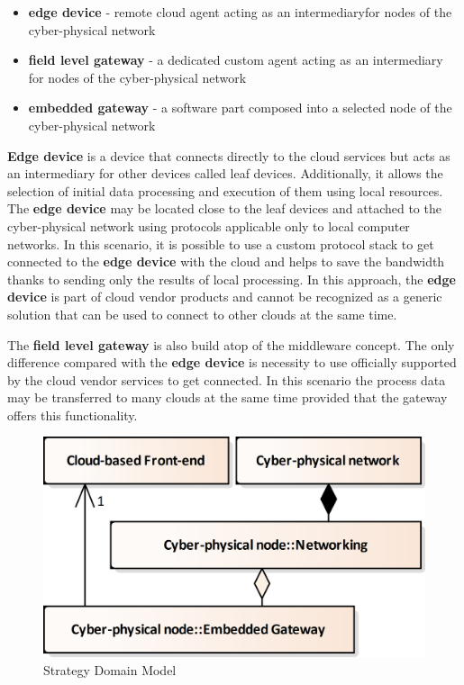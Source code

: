 \documentclass{jacsart}
\begin{document}
\begin{itemize}
      \item \textbf{edge device} - remote cloud agent acting as an intermediaryfor nodes of the cyber-physical network
      \item \textbf{field level gateway} - a dedicated custom agent acting as an intermediary for nodes of the cyber-physical network
      \item \textbf{embedded gateway} - a software part composed into a selected node of the cyber-physical network
\end{itemize}

\textbf{Edge device} is a device that connects directly to the cloud services but acts as an intermediary for other devices called leaf devices. Additionally, it allows the selection of initial data processing and execution of them using local resources. The \textbf{edge device} may be located close to the leaf devices and attached to the cyber-physical network using protocols applicable only to local computer networks. In this scenario, it is possible to use a custom protocol stack to get connected to the \textbf{edge device} with the cloud and helps to save the bandwidth thanks to sending only the results of local processing. In this approach, the \textbf{edge device} is part of cloud vendor products and cannot be recognized as a generic solution that can be used to connect to other clouds at the same time.

The \textbf{field level gateway} is also build atop of the middleware
concept. The only difference compared with the \textbf{edge device} is
necessity to use officially supported by the cloud vendor services to
get connected. In this scenario the process data may be transferred to
many clouds at the same time provided that the gateway offers this
functionality.

\begin{figure}
      \centering
      \includegraphics{../.Media/StrategyDomainModel.png}
      \caption{Strategy Domain Model}\label{StrategyDomainModel}
\end{figure}
\end{document}
